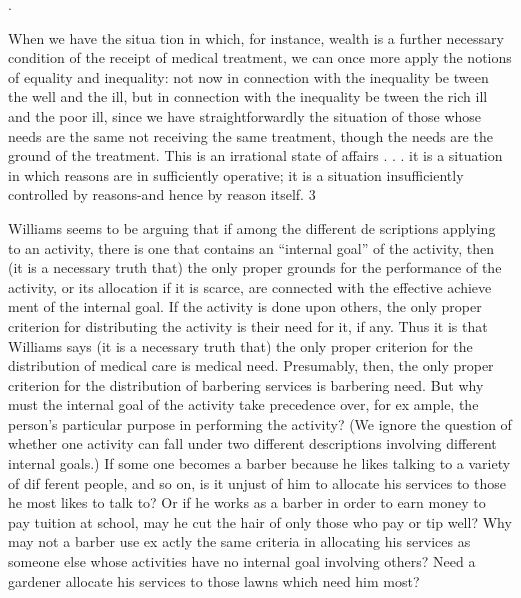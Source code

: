 \documentclass[11pt,openany]{book}
\begin{document}
.

 When we have the situa tion in which, for instance, wealth is a further necessary condition of the receipt of medical treatment, we can once more apply the notions of equality and inequality: not now in connection with the inequality be tween the well and the ill, but in connection with the inequality be tween the rich ill and the poor ill, since we have straightforwardly the situation of those whose needs are the same not receiving the same treatment, though the needs are the ground of the treatment. This is an irrational state of affairs . . . it is a situation in which reasons are in sufficiently operative; it is a situation insufficiently controlled by reasons-and hence by reason itself. 3 

Williams seems to be arguing that if among the different de scriptions applying to an activity, there is one that contains an ``internal goal'' of the activity, then (it is a necessary truth that) the only proper grounds for the performance of the activity, or its allocation if it is scarce, are connected with the effective achieve ment of the internal goal. If the activity is done upon others, the only proper criterion for distributing the activity is their need for it, if any. Thus it is that Williams says (it is a necessary truth that) the only proper criterion for the distribution of medical care is medical need. Presumably, then, the only proper criterion for the distribution of barbering services is barbering need. But why must the internal goal of the activity take precedence over, for ex ample, the person's particular purpose in performing the activity? (We ignore the question of whether one activity can fall under two different descriptions involving different internal goals.) If some one becomes a barber because he likes talking to a variety of dif ferent people, and so on, is it unjust of him to allocate his services to those he most likes to talk to? Or if he works as a barber in order to earn money to pay tuition at school, may he cut the hair of only those who pay or tip well? Why may not a barber use ex actly the same criteria in allocating his services as someone else whose activities have no internal goal involving others? Need a gardener allocate his services to those lawns which need him most? 
\end{document}
